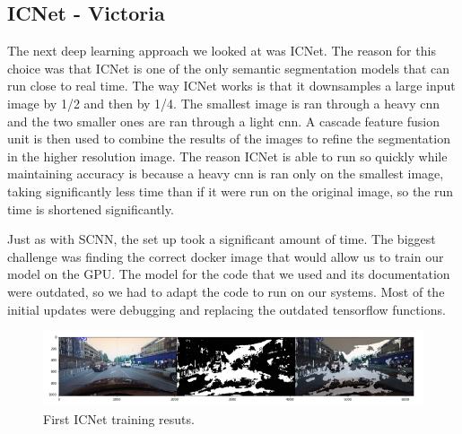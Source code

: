 \documentclass[twoside,twocolumn]{article}
\begin{document}
\subsection{ICNet - Victoria}
\par The next deep learning approach we looked at was ICNet. The reason for this choice was that ICNet is one of the only semantic segmentation models that can run close to real time. The way ICNet works is that it downsamples a large input image by 1/2 and then by 1/4. The smallest image is ran through a heavy cnn and the two smaller ones are ran through a light cnn. A cascade feature fusion unit is then used to combine the results of the images to refine the segmentation in the higher resolution image. The reason ICNet is able to run so quickly while maintaining accuracy is because a heavy cnn is ran only on the smallest image, taking significantly less time than if it were run on the original image, so the run time is shortened significantly.
\par Just as with SCNN, the set up took a significant amount of time. The biggest challenge was finding the correct docker image that would allow us to train our model on the GPU. The model for the code that we used and its documentation were outdated, so we had to adapt the code to run on our systems. Most of the initial updates were debugging and replacing the outdated tensorflow functions.

\begin{figure}
  \includegraphics[width=\linewidth]{1.png}
  \caption{First ICNet training resuts.}
  \label{fig:first}
\end{figure}
\end{document}
